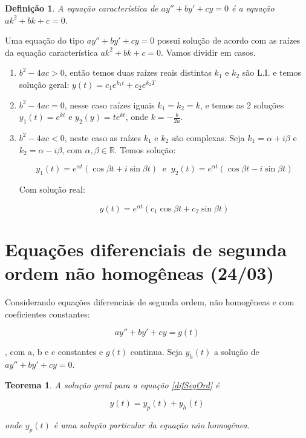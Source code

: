 \documentclass{article}
\newtheorem{theorem}{Teorema}[section]
\newtheorem{definition}{Definição}
\begin{document}
\begin{definition}
    A equação característica de $ay'' + by' + cy = 0$ é a equação $a k^2 + b k + c = 0$.
\end{definition}

Uma equação do tipo $ay'' + by' + cy = 0$ possui solução de acordo com as raízes da equação característica $a k^2 + b k + c = 0$. Vamos dividir em casos.

\begin{enumerate}
    \item $b^2 - 4 a c > 0$, então temos duas raízes reais distintas $k_1$ e $k_2$ são L.I. e temos solução geral: $y(t) = c_1 e^{k_1 t} + c_2 e^{k_2 T}$
    \item $b^2 - 4 a c = 0$, nesse caso raízes iguais $k_1 = k_2 = k$, e temos as 2 soluções $y_1(t) = e^{k t}$ e $y_2(y) = t e^{k t}$, onde $k = - \frac{b}{2 a}$.
    \item $b^2 - 4 a c < 0$, neste caso as raízes $k_1$ e $k_2$ são complexas. Seja $k_1 = \alpha + i \beta$ e $k_2 = \alpha - i \beta$, com $\alpha, \beta \in \mathbb{R}$. Temos solução:
    
    $$y_1(t) = e^{\alpha t} (\cos \beta t +  i\sin \beta t) \ \text{ e } \ y_2(t) = e^{\alpha t} (\cos \beta t -  i\sin \beta t)$$
    
    Com solução real:
    
    $$y(t) = e^{\alpha t} (c_1 \cos \beta t + c_2 \sin \beta t)$$
\end{enumerate}

\section*{Equações diferenciais de segunda ordem não homogêneas (24/03)}
\label{s8}
Considerando equações diferenciais de segunda ordem, não homogêneas e com coeficientes constantes: 

\begin{equation}\label{difSegOrd}
ay'' + b y' + c y = g(t)
\end{equation}

, com a, b e c constantes e $g(t)$ continua. Seja $y_h(t)$ a solução de $ay'' + b y' + c y = 0$.

\begin{theorem}
    A solução geral para a equação \ref{difSegOrd} é 
    
    $$y(t) = y_p (t) + y_h (t)$$
    
    onde $y_p(t)$ é uma solução particular da equação não homogênea.
\end{theorem}
\end{document}
